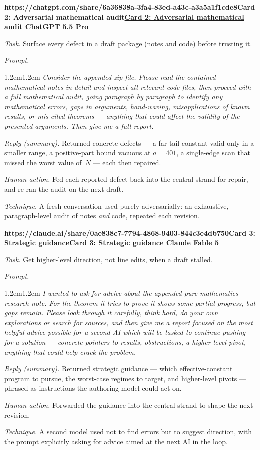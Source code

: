 \documentclass[11pt]{article}
\theoremstyle{definition}
\theoremstyle{remark}
\newenvironment{haicard}[3][]{%
  \par\medskip\noindent
  \begin{lrbox}{\haibox}%
  \begin{minipage}{\dimexpr\linewidth-2\fboxsep-2\fboxrule\relax}%
    \small
    {\sffamily\bfseries
      \def\haiurl{#1}%
      \ifx\haiurl\empty #2\else\href{#1}{\textcolor{cardlink}{#2}}\fi
      \hfill #3}\par\vspace{0.45em}%
}{%
  \end{minipage}%
  \end{lrbox}%
  \fbox{\usebox{\haibox}}%
  \par\medskip
}
\newcommand{\haifield}[1]{\textit{#1.}\enspace\ignorespaces}
\newcommand{\haiprompt}[1]{\par\vspace{0.2em}\leftskip1.2em\rightskip1.2em\relax
  \small\itshape #1\par\leftskip0pt\rightskip0pt\vspace{0.2em}}
\begin{document}
\begin{haicard}[https://chatgpt.com/share/6a36838a-3fa4-83ed-a43c-a3a5a1f1cde8]{Card 2: Adversarial mathematical audit}{ChatGPT 5.5 Pro}
\haifield{Task} Surface every defect in a draft package (notes and code) before
trusting it.\par
\haifield{Prompt} \haiprompt{Consider the appended zip file. Please read the
contained mathematical notes in detail and inspect all relevant code files, then
proceed with a full mathematical audit, going paragraph by paragraph to identify
any mathematical errors, gaps in arguments, hand-waving, misapplications of known
results, or mis-cited theorems --- anything that could affect the validity of the
presented arguments. Then give me a full report.}
\haifield{Reply (summary)} Returned concrete defects --- a far-tail constant
valid only in a smaller range, a positive-part bound vacuous at $a=401$, a
single-edge scan that missed the worst value of~$N$ --- each then repaired.\par
\haifield{Human action} Fed each reported defect back into the central strand for
repair, and re-ran the audit on the next draft.\par
\haifield{Technique} A fresh conversation used purely adversarially: an
exhaustive, paragraph-level audit of notes \emph{and} code, repeated each
revision.\par
\end{haicard}

\begin{haicard}[https://claude.ai/share/0ae838c7-7794-4868-9403-844c3e4db750]{Card 3: Strategic guidance}{Claude Fable 5}
\haifield{Task} Get higher-level direction, not line edits, when a draft stalled.\par
\haifield{Prompt} \haiprompt{I wanted to ask for advice about the appended pure
mathematics research note. For the theorem it tries to prove it shows some partial
progress, but gaps remain. Please look through it carefully, think hard, do your
own explorations or search for sources, and then give me a report focused on the
most helpful advice possible for a second AI which will be tasked to continue
pushing for a solution --- concrete pointers to results, obstructions, a
higher-level pivot, anything that could help crack the problem.}
\haifield{Reply (summary)} Returned strategic guidance --- which
effective-constant program to pursue, the worst-case regimes to target, and
higher-level pivots --- phrased as instructions the authoring model could act
on.\par
\haifield{Human action} Forwarded the guidance into the central strand to shape
the next revision.\par
\haifield{Technique} A second model used not to find errors but to suggest
direction, with the prompt explicitly asking for advice aimed at the next AI in
the loop.\par
\end{haicard}
\end{document}
